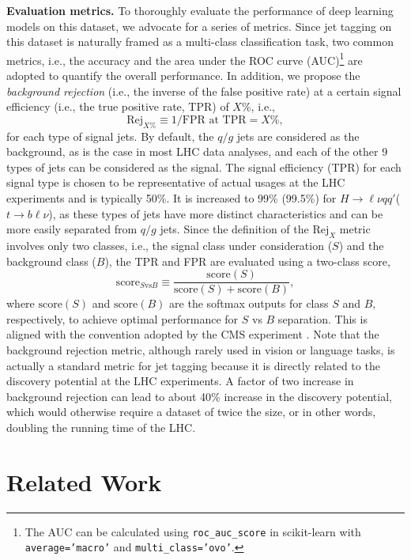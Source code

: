 \documentclass[nohyperref]{article}
\theoremstyle{plain}
\theoremstyle{definition}
\theoremstyle{remark}
\newcommand{\rej}[1]{\ensuremath{\text{Rej}_{#1}}\xspace}
\newcommand{\hlvqq}{\ensuremath{H\to \ell \nu q q'}\xspace}
\newcommand{\tblv}{\ensuremath{t\to b \ell \nu}\xspace}
\newcommand{\qgj}{\ensuremath{q/g}\xspace}
\begin{document}
\textbf{Evaluation metrics.} To thoroughly evaluate the performance of deep learning models on this dataset, we advocate for a series of metrics. Since jet tagging on this dataset is naturally framed as a multi-class classification task, two common metrics, i.e., the accuracy and the area under the ROC curve (AUC)\footnote{The AUC can be calculated using \texttt{roc\_auc\_score} in scikit-learn with \texttt{average='macro'} and \texttt{multi\_class='ovo'}.} are adopted to quantify the overall performance. In addition, we propose the \textit{background rejection} (i.e., the inverse of the false positive rate) at a certain signal efficiency (i.e., the true positive rate, TPR) of $X$\%, i.e., 
\begin{equation}
    \rej{X\%}\equiv 1/\text{FPR} \text{ at TPR}=X\%,    
\end{equation}
for each type of signal jets. By default, the \qgj jets are considered as the background, as is the case in most LHC data analyses, and each of the other 9 types of jets can be considered as the signal. The signal efficiency (TPR) for each signal type is chosen to be representative of actual usages at the LHC experiments and is typically 50\%. It is increased to 99\% (99.5\%) for \hlvqq (\tblv), as these types of jets have more distinct characteristics and can be more easily separated from \qgj jets. Since the definition of the \rej{X} metric involves only two classes, i.e., the signal class under consideration ($S$) and the background class ($B$), the TPR and FPR are evaluated using a two-class score, 
\begin{equation}
    \text{score}_{S \text{vs} B} \equiv \frac{\text{score}(S)}{\text{score}(S)+\text{score}(B)},    
\end{equation}
where $\text{score}(S)$ and $\text{score}(B)$ are the softmax outputs for class $S$ and $B$, respectively, to achieve optimal performance for $S$ vs $B$ separation. 
This is aligned with the convention adopted by the CMS experiment \cite{CMS:2020poo}. Note that the background rejection metric, although rarely used in vision or language tasks, is actually a standard metric for jet tagging because it is directly related to the discovery potential at the LHC experiments. A factor of two increase in background rejection can lead to about 40\% increase in the discovery potential, which would otherwise require a dataset of twice the size, or in other words, doubling the running time of the LHC. 


\section{Related Work}
\label{sec:related-work}
\end{document}
